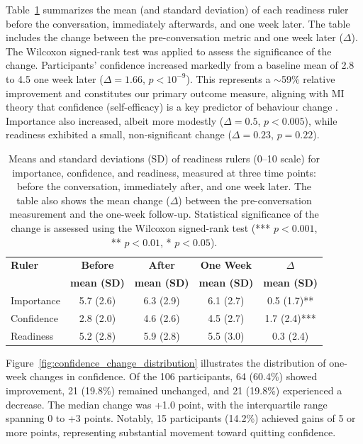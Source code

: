 Table~\ref{table:mibot_ruler_summary} summarizes the mean (and standard deviation) of each readiness ruler before the conversation, immediately afterwards, and one week later.   The table includes the change between the pre-conversation metric and one week later ($\Delta$). The Wilcoxon signed-rank test was applied to assess the significance of the change. Participants' confidence increased markedly from a baseline mean of 2.8 to 4.5 one week later ($\Delta=1.66$, $p<10^{-9}$). This represents a $\sim$59\% relative improvement and constitutes our primary outcome measure, aligning with MI theory that confidence (self-efficacy) is a key predictor of behaviour change \citep{Gwaltney2009-wj,Abar2013}. Importance also increased, albeit more modestly ($\Delta=0.5$, $p<0.005$), while readiness exhibited a small, non-significant change ($\Delta=0.23$, $p=0.22$).

\begin{table}[ht!]
  \centering
  \small
  \setlength{\tabcolsep}{4pt}
  \renewcommand{\arraystretch}{1.1}
  \begin{tabular}{@{}lcccc@{}}
    \toprule
    \textbf{Ruler} & \textbf{Before} & \textbf{After} & \textbf{One Week} & \textbf{$\Delta$} \\
    & \textbf{mean (SD)} & \textbf{mean (SD)} & \textbf{mean (SD)} & \textbf{mean (SD)} \\
    \midrule
    Importance & 5.7 (2.6) & 6.3 (2.9) & 6.1 (2.7) & 0.5 (1.7)** \\
    Confidence & 2.8 (2.0) & 4.6 (2.6) & 4.5 (2.7) & 1.7 (2.4)*** \\
    Readiness  & 5.2 (2.8) & 5.9 (2.8) & 5.5 (3.0) & 0.3 (2.4) \\
    \bottomrule
  \end{tabular}
  \caption[MIBot Readiness Ruler Summary]{Means and standard deviations (SD) of readiness rulers (0--10 scale) for importance, confidence, and readiness, measured at three time points: before the conversation, immediately after, and one week later. The table also shows the mean change ($\Delta$) between the pre-conversation measurement and the one-week follow-up. Statistical significance of the change is assessed using the Wilcoxon signed-rank test (*** $p < 0.001$, ** $p < 0.01$, * $p < 0.05$).}
  \label{table:mibot_ruler_summary}
\end{table}

Figure~\ref{fig:confidence_change_distribution} illustrates the distribution of one-week changes in confidence. Of the 106 participants, 64 (60.4\%) showed improvement, 21 (19.8\%) remained unchanged, and 21 (19.8\%) experienced a decrease. The median change was +1.0 point, with the interquartile range spanning 0 to +3 points. Notably, 15 participants (14.2\%) achieved gains of 5 or more points, representing substantial movement toward quitting confidence.

